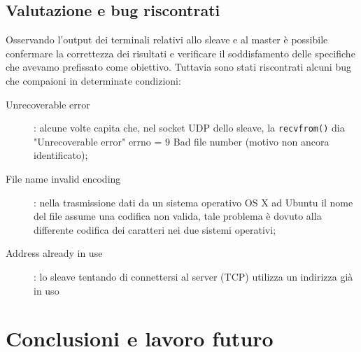 \documentclass[11pt,fleqn]{book} %
\begin{document}
\section{Valutazione e bug riscontrati}
Osservando l'output dei terminali relativi allo sleave e al master è possibile confermare la correttezza dei risultati e verificare il soddisfamento delle specifiche che avevamo prefissato come obiettivo. Tuttavia sono stati riscontrati alcuni bug che compaioni in determinate condizioni:
\begin{description}
	\item[Unrecoverable error]: alcune volte capita che, nel socket UDP dello sleave, la \texttt{recvfrom()} dia "Unrecoverable error" errno = 9 Bad 		file number (motivo non ancora identificato);
	\item[File name invalid encoding]: nella trasmissione dati da un sistema operativo OS X ad Ubuntu il nome del file assume una codifica non 			valida, tale problema è dovuto alla differente codifica dei caratteri nei due sistemi operativi;
	\item[Address already in use]: lo sleave tentando di connettersi al server (TCP) utilizza un indirizza già in uso 
\end{description}






\chapter{Conclusioni e lavoro futuro}
\end{document}

